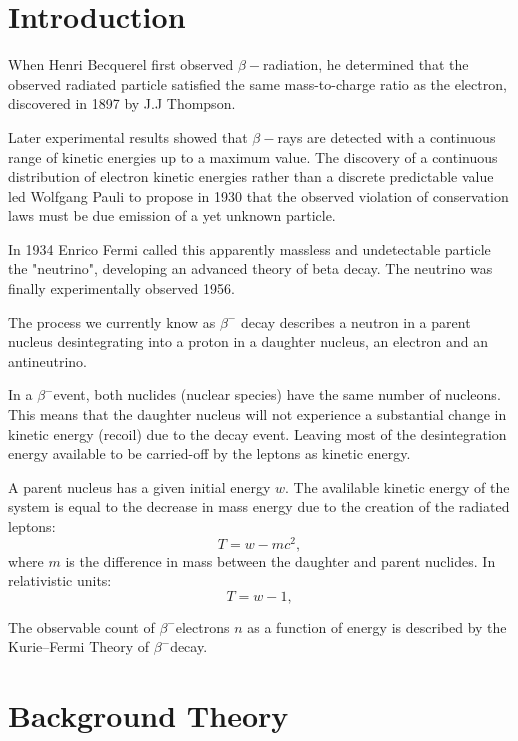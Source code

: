 \documentclass[10pt, a4paper]{article}
\begin{document}
\section{Introduction}
\begin{multicols}{2}
When Henri Becquerel first observed $\beta-$radiation, he determined that the observed radiated particle satisfied the same mass-to-charge ratio as the electron, discovered in 1897 by J.J Thompson\cite{Wikipedia-particle}. 

Later experimental results showed that $\beta-$rays are detected with a continuous range of kinetic energies up to a maximum value\cite{SMM}. 
The discovery of a continuous distribution of electron kinetic energies rather than a discrete predictable value led Wolfgang Pauli to propose in 1930 that the observed violation of conservation laws must be due emission of a yet unknown particle.

In 1934 Enrico Fermi called this apparently massless and undetectable particle the "neutrino", developing an advanced theory of beta decay. The neutrino was finally experimentally observed 1956.\cite{Nave-beta} 

The process we currently know as $\beta^{-}$ decay describes a neutron in a parent nucleus desintegrating into a proton in a daughter nucleus, an electron and an antineutrino.

In a $\beta^{-}$event, both nuclides (nuclear species) have the same number of nucleons. This means that the daughter nucleus will not experience a substantial change in kinetic energy (recoil) due to the decay event. Leaving most of the desintegration energy available to be carried-off by the leptons as kinetic energy. 

A parent nucleus has a given initial energy $w$. 
The avalilable kinetic energy of the system is equal to the decrease in mass energy due to the creation of the radiated leptons:
\begin{equation}T = w - m c^2,
\end{equation} where $m$ is the difference in mass between the daughter and parent nuclides.
In relativistic units:
\begin{equation}T = w - 1,
\end{equation}

The observable count of $\beta^{-}$electrons $n$ as a function of energy is described by the Kurie--Fermi Theory of $\beta^{-}$decay.

\section{Background Theory}


\end{multicols}
\end{document}
